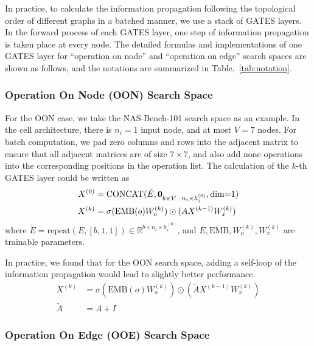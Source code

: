 \documentclass[runningheads]{llncs}
\begin{document}
In practice, to calculate the information propagation following the topological order of different graphs in a batched manner, we use a stack of GATES layers. In the forward process of each GATES layer, one step of information propagation is taken place at every node. The detailed formulas and implementations of one GATES layer for ``operation on node'' and ``operation on edge'' search spaces are shown as follows, and the notations are summarized in Table.~\ref{tab:notation}.

\subsubsection{Operation On Node (OON) Search Space}

For the OON case, we take the NAS-Bench-101 search space as an example. In the cell architecture, there is $n_i=1$ input node, and at most $V=7$ nodes. For batch computation, we pad zero columns and rows into the adjacent matrix to ensure that all adjacent matrices are of size $7\times7$, and also add none operations into the corresponding positions in the operation list. The calculation of the $k$-th GATES layer could be written as
\begin{equation}
\begin{aligned}
X^{(0)} &= \mbox{CONCAT}(\tilde{E}, {\bf 0}_{b \times V-n_i \times h_i^{(0)}}, \mbox{dim=1})\\
X^{(k)} &= \sigma(\mbox{EMB}(o) W^{(k)}_o) \odot (A X^{(k-1)} W^{(k)}_x)
\end{aligned}
\label{eq:gates_nasbench}
\end{equation}
where $\tilde{E} = \mbox{repeat}(E, [b, 1, 1]) \in \mathbb{R}^{b \times n_i \times h^{(0)}_i}$, and $E, \mbox{EMB}, W^{(k)}_o, W^{(k)}_x$ are trainable parameters.



In practice, we found that for the OON search space, adding a self-loop of the information propagation would lead to slightly better performance. 
\begin{equation}
    \begin{aligned}
        X^{(k)} &= \sigma(\mbox{EMB}(o) W^{(k)}_o) \odot (\tilde{A} X^{(k-1)} W^{(k)}_x) \\
        \tilde{A} &= A + I
    \end{aligned}
\end{equation}


\subsubsection{Operation On Edge (OOE) Search Space}
\end{document}
